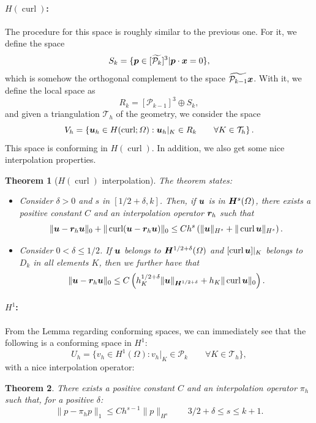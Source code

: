 \documentclass{article}
\renewcommand{\vec}{\vectorsym}
\DeclareMathOperator{\curl}{\text{curl}}
\newcommand{\T}{\mathcal{T}}
\renewcommand{\P}{\mathcal{P}}
\newtheorem{theorem}{Theorem}
\begin{document}
\paragraph{$H(\curl)$:} The procedure for this space is roughly similar to the previous one. For it, we define the space
    $$ S_k = \{ \vec p \in [\widetilde{\P_k}]^3 | \vec p \cdot \vec x = 0 \}, $$
which is somehow the orthogonal complement to the space $\widetilde{\P_{k-1}}\vec x$. With it, we define the local space as 
    $$ R_k = [\P_{k-1}]^3\oplus S_k, $$
and given a triangulation $\T_h$ of the geometry, we consider the space
    $$ V_h = \left\{ \vec u_h \in H(\curl;\Omega): \vec u_h|_K \in R_k\qquad \forall K\in \T_h\right\}. $$
This space is conforming in $H(\curl)$. In addition, we also get some nice interpolation properties. 
    \begin{theorem}[$H(\curl)$ interpolation] The theorem states: 
    
        \begin{itemize}
            \item Consider $\delta>0$ and $s$ in $[1/2+\delta, k]$. Then, if $\vec u$ is in $\vec H^s(\Omega)$, there exists a positive constant $C$ and an interpolation operator $\vec r_h$ such that 
                $$ \| \vec u - \vec r_h \vec u\|_0 + \| \curl(\vec u - \vec r_h \vec u) \|_0 \leq C h^s \left(\| \vec u\|_{H^s} + \| \curl \vec u \|_{H^s}\right) . $$
            \item Consider $0<\delta\leq 1/2$. If $\vec u$ belongs to $\vec H^{1/2+\delta}(\Omega)$ and $[\curl \vec u]|_K$ belongs to $D_k$ in all elements $K$, then we further have that
                $$ \|\vec u - \vec r_h \vec u\|_0 \leq C\left(h_K^{1/2+\delta} \| \vec u\|_{\vec H^{1/2+\delta}} + h_K \| \curl \vec u\|_0 \right). $$
        \end{itemize}
    \end{theorem}
\paragraph{$H^1$:} From the Lemma regarding conforming spaces, we can immediately see that the following is a conforming space in $H^1$: 
    $$ U_h = \{ v_h \in H^1(\Omega): v_h|_K \in \P_k \qquad\forall K\in \T_h\}, $$
with a nice interpolation operator:
    \begin{theorem}
        There exists a positive constant $C$ and an interpolation operator $\pi_h$ such that, for a positive $\delta$: 
         $$\|p - \pi_h p \|_1 \leq C h^{s-1} \|p\|_{H^s} \qquad 3/2+\delta \leq s \leq k+1 . $$
    \end{theorem}
\end{document}
